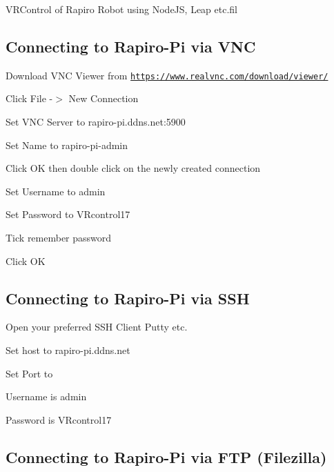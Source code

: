 V\+R\+Control of Rapiro Robot using Node\+J\+S, Leap etc.\+fil 



\subsection*{Connecting to Rapiro-\/\+Pi via V\+N\+C}


\begin{DoxyEnumerate}
\item Download V\+N\+C Viewer from \href{https://www.realvnc.com/download/viewer/}{\tt https\+://www.\+realvnc.\+com/download/viewer/}
\item Click File -\/$>$ New Connection
\item Set V\+N\+C Server to {\ttfamily rapiro-\/pi.\+ddns.\+net\+:5900}
\item Set Name to {\ttfamily rapiro-\/pi-\/admin}
\item Click O\+K then double click on the newly created connection
\item Set Username to {\ttfamily admin}
\item Set Password to {\ttfamily V\+Rcontrol17}
\item Tick remember password
\item Click O\+K
\end{DoxyEnumerate}

\subsection*{Connecting to Rapiro-\/\+Pi via S\+S\+H}


\begin{DoxyEnumerate}
\item Open your preferred S\+S\+H Client Putty etc.
\item Set host to {\ttfamily rapiro-\/pi.\+ddns.\+net}
\item Set Port to {}
\item Username is {\ttfamily admin}
\item Password is {\ttfamily V\+Rcontrol17}
\end{DoxyEnumerate}

\subsection*{Connecting to Rapiro-\/\+Pi via F\+T\+P (Filezilla)}


